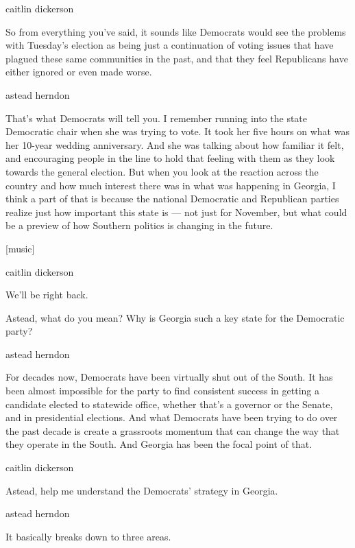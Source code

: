 caitlin dickerson

So from everything you've said, it sounds like Democrats would see the
problems with Tuesday's election as being just a continuation of voting
issues that have plagued these same communities in the past, and that
they feel Republicans have either ignored or even made worse.

astead herndon

That's what Democrats will tell you. I remember running into the state
Democratic chair when she was trying to vote. It took her five hours on
what was her 10-year wedding anniversary. And she was talking about how
familiar it felt, and encouraging people in the line to hold that
feeling with them as they look towards the general election. But when
you look at the reaction across the country and how much interest there
was in what was happening in Georgia, I think a part of that is because
the national Democratic and Republican parties realize just how
important this state is --- not just for November, but what could be a
preview of how Southern politics is changing in the future.

{[}music{]}

caitlin dickerson

We'll be right back.

Astead, what do you mean? Why is Georgia such a key state for the
Democratic party?

astead herndon

For decades now, Democrats have been virtually shut out of the South. It
has been almost impossible for the party to find consistent success in
getting a candidate elected to statewide office, whether that's a
governor or the Senate, and in presidential elections. And what
Democrats have been trying to do over the past decade is create a
grassroots momentum that can change the way that they operate in the
South. And Georgia has been the focal point of that.

caitlin dickerson

Astead, help me understand the Democrats' strategy in Georgia.

astead herndon

It basically breaks down to three areas.

